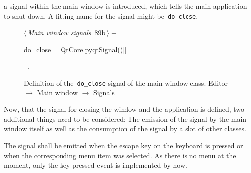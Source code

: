 \documentclass[%
    a4paper,    %
    justified,  %
    nobib,      %
    openany     %
]{tufte-book}
\makeatletter
\renewcommand{\label}[1]{\@tufte@label{##1}}%
\makeatother
\begin{document}
 a signal within the main window is
introduced, which tells the main application to shut down. A fitting name for
the signal might be~\verb=do_close=.

\begin{figure}[!htpb]
\begin{flushleft} \small
\begin{minipage}{\linewidth}\label{scrap16}\raggedright\small
{} $\langle\,${\itshape Main window signals}\nobreak\ {\footnotesize {89b}}$\,\rangle\equiv$
\vspace{-1ex}
\begin{pythoncode}
do_close = QtCore.pyqtSignal()|\NWsep|
\end{pythoncode}
\vspace{1.5ex}
\footnotesize
\begin{list}{}{\setlength{\itemsep}{-\parsep}\setlength{\itemindent}{-\leftmargin}}
\item \NWtxtMacroRefIn\ .

\item{}
\end{list}
\end{minipage}\vspace{4ex}
\end{flushleft}
\caption{Definition of the~\texttt{do\_close} signal of the main window class.
  \newline{}\newline{}Editor $\rightarrow$ Main window $\rightarrow$ Signals}
\end{figure}

Now, that the signal for closing the window and the application is defined, two
additional things need to be considered: The emission of the signal by
the main window itself as well as the consumption of the signal by a slot of
other classes.

The signal shall be emitted when the escape key on the keyboard is pressed or
when the corresponding menu item was selected. As there is no menu at the
moment, only the key pressed event is implemented by now.
\end{document}
